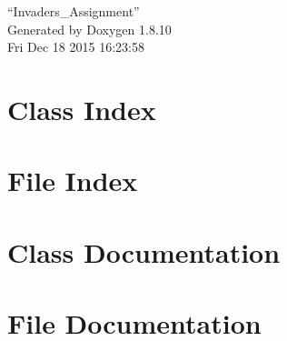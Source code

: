 \documentclass[twoside]{book}
\newcommand{\+}{\discretionary{\mbox{\scriptsize$\hookleftarrow$}}{}{}}
\newcommand{\clearemptydoublepage}{%
  \newpage{\pagestyle{empty}\cleardoublepage}%
}
\begin{document}
\hypersetup{pageanchor=false,
             bookmarks=true,
             bookmarksnumbered=true,
             pdfencoding=unicode
            }
\begin{titlepage}
\vspace*{7cm}
\begin{center}%
{\Large “\+Invaders\+\_\+\+Assignment” }\\
\vspace*{1cm}
{\large Generated by Doxygen 1.8.10}\\
\vspace*{0.5cm}
{\small Fri Dec 18 2015 16:23:58}\\
\end{center}
\end{titlepage}
\clearemptydoublepage
\tableofcontents
\clearemptydoublepage
{}
\hypersetup{pageanchor=true}

\chapter{Class Index}

\chapter{File Index}

\chapter{Class Documentation}




\chapter{File Documentation}


















































\backmatter
\newpage
{}
\clearemptydoublepage
{}
\printindex
\end{document}

